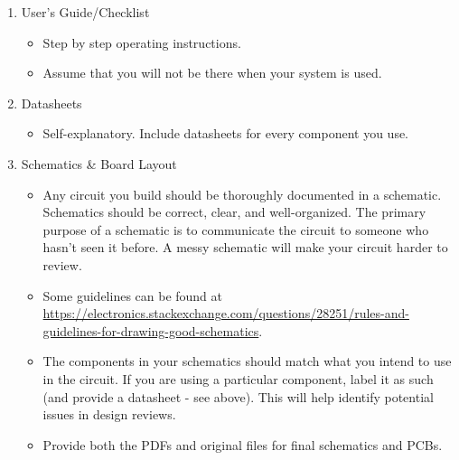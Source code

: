 \documentclass{article}
\begin{document}
\begin{enumerate}
\item User's Guide/Checklist
\begin{itemize}
\item Step by step operating instructions.
\item Assume that you will not be there when your system is used.
\end{itemize}
\item Datasheets
\begin{itemize}
\item Self-explanatory. Include datasheets for every component you use.
\end{itemize}
\item Schematics \& Board Layout
\begin{itemize}
\item Any circuit you build should be thoroughly documented in a schematic. Schematics should be correct, clear, and well-organized. The primary purpose of a schematic is to communicate the circuit to someone who hasn't seen it before. A messy schematic will make your circuit harder to review.
\item Some guidelines can be found at \url{https://electronics.stackexchange.com/questions/28251/rules-and-guidelines-for-drawing-good-schematics}.
\item The components in your schematics should match what you intend to use in the circuit. If you are using a particular component, label it as such (and provide a datasheet - see above). This will help identify potential issues in design reviews.
\item Provide both the PDFs and original files for final schematics and PCBs.
\end{itemize}
\end{enumerate}

\end{document}
